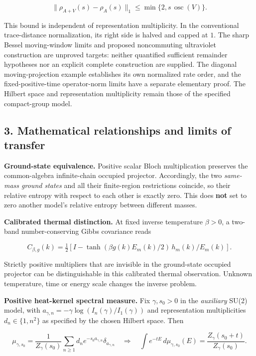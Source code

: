 \documentclass[
  10pt,
  a4paper,
]{article}
\begin{document}
\[
\boxed{\|\rho_{A+V}(s)-\rho_A(s)\|_1
\le\min\{2,s\,\operatorname{osc}(V)\}.}
\]

This bound is independent of representation multiplicity. In the conventional trace-distance normalization, its right side is halved and capped at \(1\). The sharp Bessel moving-window limits and proposed noncommuting ultraviolet construction are unproved targets: neither quantified sufficient remainder hypotheses nor an explicit complete construction are supplied. The diagonal moving-projection example establishes its own normalized rate order, and the fixed-positive-time operator-norm limits have a separate elementary proof. The Hilbert space and representation multiplicity remain those of the specified compact-group model.

\subsection{3. Mathematical relationships and limits of transfer}\label{mathematical-relationships-and-limits-of-transfer}

\textbf{Ground-state equivalence.} Positive scalar Bloch multiplication preserves the common-algebra infinite-chain occupied projector. Accordingly, the two \emph{same-mass ground states} and all their finite-region restrictions coincide, so their relative entropy with respect to each other is exactly zero. This does \textbf{not} set to zero another model's relative entropy between different masses.

\textbf{Calibrated thermal distinction.} At fixed inverse temperature \(\beta>0\), a two-band number-conserving Gibbs covariance reads

\[
C_{\beta,g}(k)=\tfrac12\left[I-\tanh(\beta g(k) E_m(k)/2)\,h_m(k)/E_m(k)\right].
\]

Strictly positive multipliers that are invisible in the ground-state occupied projector can be distinguishable in this calibrated thermal observation. Unknown temperature, time or energy scale changes the inverse problem.

\textbf{Positive heat-kernel spectral measure.} Fix \(\gamma,s_0>0\) in the \emph{auxiliary} SU(2) model, with \(a_{\gamma,n}=-\gamma\log(I_n(\gamma)/I_1(\gamma))\) and representation multiplicities \(d_n\in\{1,n^2\}\) as specified by the chosen Hilbert space. Then

\[
\mu_{\gamma,s_0}=\frac1{Z_\gamma(s_0)}\sum_{n\ge1}d_n e^{-s_0a_{\gamma,n}}\delta_{a_{\gamma,n}}
\quad\Longrightarrow\quad
\int e^{-tE}\,d\mu_{\gamma,s_0}(E)=\frac{Z_\gamma(s_0+t)}{Z_\gamma(s_0)}.
\]
\end{document}
